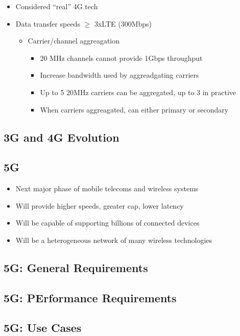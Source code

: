 \begin{itemize}
	\item Considered ``real'' 4G tech
	\item Data transfer speeds $\ge$ 3xLTE (300Mbps)
	\begin{itemize}
		\item Carrier/channel aggreagation
		\begin{itemize}
			\item 20 MHz channels cannot provide 1Gbps
				throughput
			\item Increase bandwidth used by aggreadgating
				carriers
			\item Up to 5 20MHz carriers can be aggregated,
				up to 3 in practive
			\item When carriers aggreagated, can either
				primary or secondary
		\end{itemize}
	\end{itemize}
\end{itemize}

\subsection{3G and 4G Evolution}

\subsection{5G}

\begin{itemize}
	\item Next major phase of mobile telecoms and wireless systems
	\item Will provide higher speeds, greater cap, lower latency
	\item Will be capable of supporting billions of connected devices
	\item Will be a heterogeneous network of many wireless technologies
\end{itemize}

\subsection{5G: General Requirements}

\subsection{5G: PErformance Requirements}

\subsection{5G: Use Cases}

